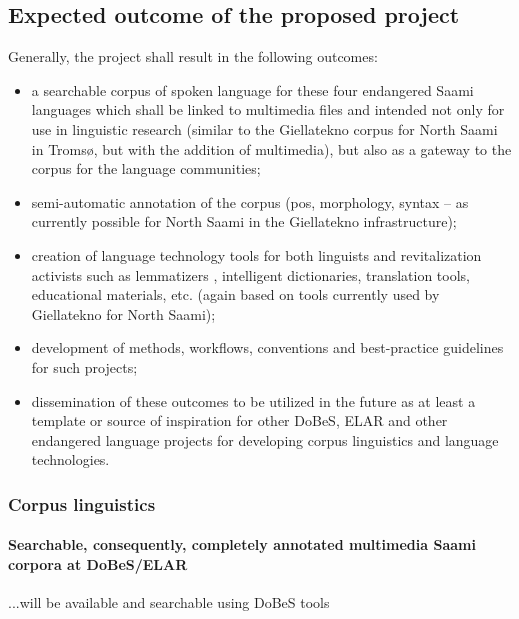 \documentclass[a4paper,12pt]{article}
\begin{document}
\subsection{Expected outcome of the proposed project}%
Generally, the project shall result in the following outcomes:
\begin{itemize}
\item a searchable corpus of spoken language for these four endangered Saami languages which shall be linked to multimedia files and intended not only %
for use in linguistic research (similar to the Giellatekno corpus for North Saami in Tromsø, but with the addition of multimedia), but also as a gateway to the corpus for the language communities;
\item semi-automatic annotation of the corpus (pos, morphology, syntax – as currently possible for North Saami in the Giellatekno infrastructure);
\item creation of language technology tools for both linguists and revitalization activists such as lemmatizers%
, intelligent dictionaries, translation tools, educational materials, etc. (again based on tools currently used by Giellatekno for North Saami); 
\item development of methods, workflows, conventions and best-practice guidelines for such projects;
\item dissemination of these outcomes to be utilized in the future as at least a template or source of inspiration for other DoBeS, ELAR and other endangered language projects for developing corpus linguistics and language technologies.
\end{itemize}

\subsubsection{Corpus linguistics}
\paragraph{Searchable, consequently, completely annotated multimedia Saami corpora at DoBeS/ELAR}
...will be available and searchable using DoBeS tools
\end{document}
